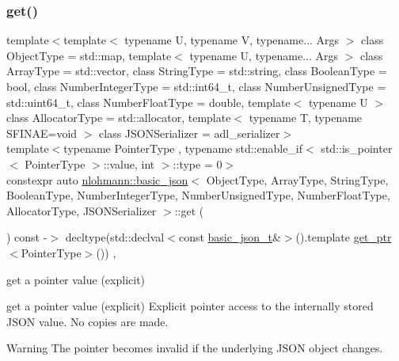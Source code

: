\subsubsection{\texorpdfstring{get()}{get()}\hspace{0.1cm}{\footnotesize\ttfamily [6/6]}}
{\footnotesize\ttfamily template$<$template$<$ typename U, typename V, typename... Args $>$ class Object\+Type = std\+::map, template$<$ typename U, typename... Args $>$ class Array\+Type = std\+::vector, class String\+Type  = std\+::string, class Boolean\+Type  = bool, class Number\+Integer\+Type  = std\+::int64\+\_\+t, class Number\+Unsigned\+Type  = std\+::uint64\+\_\+t, class Number\+Float\+Type  = double, template$<$ typename U $>$ class Allocator\+Type = std\+::allocator, template$<$ typename T, typename S\+F\+I\+N\+A\+E=void $>$ class J\+S\+O\+N\+Serializer = adl\+\_\+serializer$>$ \\
template$<$typename Pointer\+Type , typename std\+::enable\+\_\+if$<$ std\+::is\+\_\+pointer$<$ Pointer\+Type $>$\+::value, int $>$\+::type  = 0$>$ \\
constexpr auto \mbox{\hyperlink{classnlohmann_1_1basic__json}{nlohmann\+::basic\+\_\+json}}$<$ Object\+Type, Array\+Type, String\+Type, Boolean\+Type, Number\+Integer\+Type, Number\+Unsigned\+Type, Number\+Float\+Type, Allocator\+Type, J\+S\+O\+N\+Serializer $>$\+::get (\begin{DoxyParamCaption}{ }\end{DoxyParamCaption}) const -\/$>$ decltype(std\+::declval$<$const \mbox{\hyperlink{classnlohmann_1_1basic__json_afff7860310ae69f29f8158a77ec0ef13}{basic\+\_\+json\+\_\+t}}\&$>$().template \mbox{\hyperlink{classnlohmann_1_1basic__json_afb283ec92e108f9561a86427a609b87c}{get\+\_\+ptr}}$<$Pointer\+Type$>$())
    \hspace{0.3cm}{\ttfamily [inline]}, {\ttfamily [noexcept]}}



get a pointer value (explicit) 

get a pointer value (explicit) Explicit pointer access to the internally stored J\+S\+ON value. No copies are made.

\begin{DoxyWarning}{Warning}
The pointer becomes invalid if the underlying J\+S\+ON object changes.
\end{DoxyWarning}

